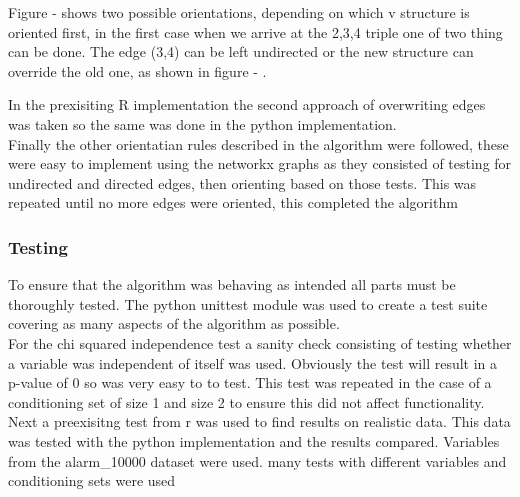 \documentclass{article}
\begin{document}
Figure - shows two possible orientations, depending on which v structure is oriented first, in the first case when we arrive at the 2,3,4 triple one of two thing can be done. The edge (3,4) can be left undirected or the new structure can override the old one, as shown in figure - .\\

\begin{center}
\end{center}

In the prexisiting R implementation the second approach of overwriting edges was taken so the same was done in the python implementation.\\

Finally the other orientatian rules described in the algorithm were followed, these were easy to implement using the networkx graphs as they consisted of testing for undirected and directed edges, then orienting based on those tests. This was repeated until no more edges were oriented, this completed the algorithm


\subsubsection{Testing}

To ensure that the algorithm was behaving as intended all parts must be thoroughly tested. The python unittest module was used to create a test suite covering as many aspects of the algorithm as possible.\\

For the chi squared independence test a sanity check consisting of testing whether a variable was independent of itself was used. Obviously the test will result in a p-value of 0 so was very easy to to test. This test was repeated in the case of a conditioning set of size 1 and size 2 to ensure this did not affect functionality.\\

Next a preexisitng test from r was used to find results on realistic data. This data was tested with the python implementation and the results compared. Variables from the alarm\_10000 dataset were used. many tests with different variables and conditioning sets were used
\end{document}
